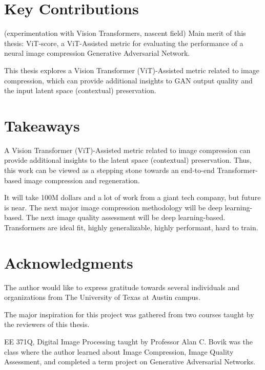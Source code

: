 \section{Key Contributions}

(experimentation with Vision Transformers, nascent field)
Main merit of this thesis:
ViT-score, a ViT-Assisted metric for evaluating the performance of a neural image compression
Generative Adversarial Network.

This thesis explores a Vision Transformer (ViT)-Assisted metric related to 
image compression, which can provide 
additional insights to GAN output quality and the input latent space (contextual) preservation.



\section{Takeaways}

A Vision Transformer (ViT)-Assisted metric related to image compression can provide 
additional insights to the latent space (contextual) preservation.
Thus, this work can be viewed as a stepping stone towards an end-to-end Transformer-based
image compression and regeneration.

It will take 100M dollars and a lot of work from a giant tech company, but
future is near. The next major image compression methodology will be deep learning-based.
The next image quality assessment will be deep learning-based.
Transformers are ideal fit, highly generalizable, highly performant, hard to train.


\section{Acknowledgments}

The author would like to express gratitude towards several individuals and organizations
from The University of Texas at Austin campus.


The major inspiration for this project was gathered from two courses taught by the
reviewers of this thesis.


EE 371Q, Digital Image Processing taught by Professor Alan C. Bovik was the class
where the author learned about 
Image Compression, Image Quality Assessment, and completed a term
project on Generative Adversarial Networks.


